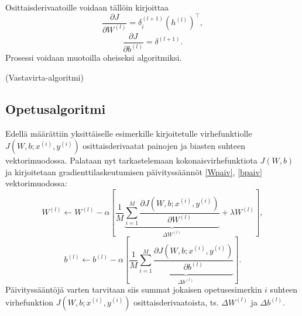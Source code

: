 \documentclass[12pt,a4paper,finnish,oneside,titlepage]{article}
\makeatletter
\newcommand{\multiline}[1]{%
    \begin{tabularx}{\dimexpr\linewidth-\ALG@thistlm}[t]{@{}X@{}}
        #1
    \end{tabularx}
}
\newcommand{\Input}[1]{\algrenewcommand{\alglinenumber}[1]{\textbf{Syöte:} \ \setcounter{ALG@line}{\numexpr##1-1}} #1}
\newcommand{\Step}[1]{\algrenewcommand{\alglinenumber}[1]{Askel ##1: } #1}
\newcommand{\NoNumber}{\algrenewcommand{\alglinenumber}[1]{\setcounter{ALG@line}{\numexpr##1-1} \ \ \ \ \ \ \ \ \ \ }}
\newcommand{\Output}[1]{\algrenewcommand{\alglinenumber}[1]{\textbf{Ulostulo:}\setcounter{ALG@line}{\numexpr##1-1}} #1}
\theoremstyle{plain}
\theoremstyle{definition}
\theoremstyle{remark}
\makeatother
\begin{document}
Osittaisderivaatoille voidaan tällöin kirjoittaa \begin{equation} \label{Wosit} \frac{\partial J}{\partial W^{(l)}}=\delta_i^{(l+1)} (h^{(l)})^{\top},\end{equation}
\begin{equation}\label{bosit} \frac{\partial J}{\partial b^{(l)}}=\delta^{(l+1)}.\end{equation}
Prosessi voidaan muotoilla oheiseksi algoritmiksi.
\begin{algorithm}[H]
\renewcommand{\thealgorithm}{2}
    \caption{(Vastavirta-algoritmi)}
\end{algorithm}

\subsection{Opetusalgoritmi}
Edellä määrättiin yksittäiselle esimerkille kirjoitetulle virhefunktiolle \(J(W, b; x^{(i)}, y^{(i)})\) osittaisderivaatat painojen ja biasten suhteen vektorimuodossa. Palataan nyt tarkastelemaan kokonaisvirhefunktiota \(J(W, b)\) ja kirjoitetaan gradienttilaskeutumisen päivityssäännöt \ref{Wpaiv}, \ref{bpaiv} vektorimuodossa:
\begin{equation} \label{Wkok} W^{(l)}\leftarrow W^{(l)} - \alpha\left[\frac{1}{M} \underbrace{\sum_{i=1}^{M} \frac{\partial J(W, b; x^{(i)}, y^{(i)})}{\partial W^{(l)}}}_{\Delta W^{(l)}}+\lambda W^{(l)}\right],\end{equation}
\begin{equation} \label{bkok} b^{(l)}\leftarrow b^{(l)} - \alpha\left[\frac{1}{M} \underbrace{\sum_{i=1}^{M} \frac{\partial J(W, b; x^{(i)}, y^{(i)})}{\partial b^{(l)}}}_{\Delta b^{(l)}}\right].\end{equation}
Päivityssääntöjä varten tarvitaan siis summat jokaisen opetusesimerkin \(i\) suhteen virhefunktion \(J(W, b; x^{(i)}, y^{(i)})\) osittaisderivaatoista, ts. \(\Delta W^{(l)}\) ja \(\Delta b^{(l)}\).
\end{document}
